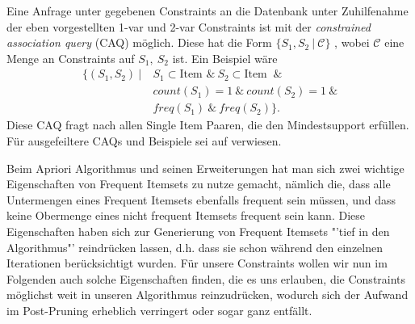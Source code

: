 Eine Anfrage unter gegebenen Constraints an die Datenbank
unter Zuhilfenahme der eben vorgestellten 1-var und 2-var 
Constraints ist mit der \textit{constrained association
query} (CAQ) möglich. Diese hat die Form \(\{S_1,S_2
\ |\ \mathcal{C}\}\)	, wobei \(\mathcal{C}\) eine
Menge an Constraints auf \(S_1,\ S_2\) ist. Ein Beispiel
wäre 
\begin{align*}
\{(S_1,S_2)\ |\ &S_1\subset \text{Item }\&\ 
S_2\subset \text{Item }\ \&\\
&count(S_1) = 1\ \&\ count(S_2) = 1\ \&\\
&freq(S_1)\ \&\ freq(S_2)\}.
\end{align*}
Diese CAQ fragt nach allen Single Item Paaren, die den 
Mindestsupport erfüllen. Für ausgefeiltere CAQs und Beispiele
sei auf \citet{Ng98} verwiesen.

Beim Apriori Algorithmus und seinen Erweiterungen hat
man sich zwei wichtige Eigenschaften von Frequent Itemsets
zu nutze gemacht, nämlich die, dass alle Untermengen eines
Frequent Itemsets ebenfalls frequent sein müssen, und
dass keine Obermenge eines nicht frequent Itemsets frequent
sein kann. Diese Eigenschaften haben sich zur Generierung
von Frequent Itemsets "'tief in den Algorithmus"' reindrücken
lassen, d.h. dass sie schon während den einzelnen Iterationen 
berücksichtigt wurden. Für unsere Constraints wollen wir
nun im Folgenden auch solche Eigenschaften finden, die es
uns erlauben, die Constraints möglichst weit in unseren
Algorithmus reinzudrücken, wodurch sich der Aufwand im
Post-Pruning erheblich verringert oder sogar ganz entfällt.

